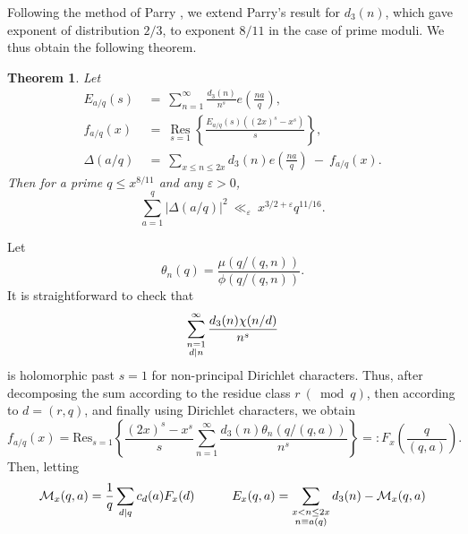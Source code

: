 \documentclass[oneside,reqno,10pt]{amsart}
\numberwithin{equation}{section}
\theoremstyle{plain}
\newtheorem{theorem}{Theorem}[section]
\theoremstyle{definition}
\numberwithin{equation}{section}
\begin{document}
Following the method of Parry \cite{Pa2}, we extend Parry’s result \cite{Pa1} for $d_3(n)$, which gave exponent of distribution $2/3$, to exponent $8/11$ in the case of prime moduli. We thus obtain the following theorem.
\begin{theorem}\label{maintheorem}
    Let 
    \begin{align*}
        E_{a/q}(s)\ &=\ \sum_{n=1}^{\infty} \frac{d_3(n)}{n^s} e\left( \frac{na}{q} \right), \\
        f_{a/q}(x)\ &=\ \underset{s=1}{\operatorname{Res}} \left\{ \frac{E_{a/q}(s) \left( (2x)^s - x^s \right)}{s} \right\}, \\
        \Delta(a/q)\ &=\ \sum_{x \leq n \leq 2x} d_3(n) e\left( \frac{na}{q} \right)\ -\ f_{a/q}(x).
    \end{align*}
    Then for a prime $q \le x^{8/11}$ and any $\varepsilon > 0$,
    \begin{equation*}
        \sum_{a=1}^q |\Delta(a/q)|^2\ \ll_{\varepsilon}\ x^{3/2+\varepsilon} q^{11/16}.
    \end{equation*}
\end{theorem}
 Let
\begin{equation*}
    \theta_{n}(q)=\frac{\mu(q/(q,n))}{\phi(q/(q,n))}.
\end{equation*}
 It is straightforward to check that
\begin{equation*}
    \sum_{\begin{subarray}{c}n=1\\ d|n\end{subarray}}^{\infty}\frac{d_{3}(n)\chi(n/d)}{n^{s}}
\end{equation*}
is holomorphic past $s=1$ for non-principal Dirichlet characters. Thus, after decomposing the sum according to the residue class $r\ (\bmod q)$, then according to $d=(r,q)$, and finally using Dirichlet characters, we obtain
\begin{equation*}
f_{a/q}(x) = \mathrm{Res}_{s=1}\left\{\frac{(2x)^{s}-x^{s}}{s}\sum_{n=1}^{\infty}\frac{d_{3}(n)\theta_{n}(q/(q,a))}{n^{s}}\right\}=:F_{x}\left(\frac{q}{(q,a)}\right).
\end{equation*}
Then, letting
\begin{equation*}
\mathcal{M}_{x}(q,a)=\frac{1}{q}\sum_{d|q}c_{d}(a)F_{x}(d)\qquad\quad E_{x}(q,a)= \sum_{\begin{subarray}{c}x<n\leq 2x\\ n\equiv a(q)\end{subarray}}d_{3}(n)-\mathcal{M}_{x}(q,a)
\end{equation*}
\end{document}
